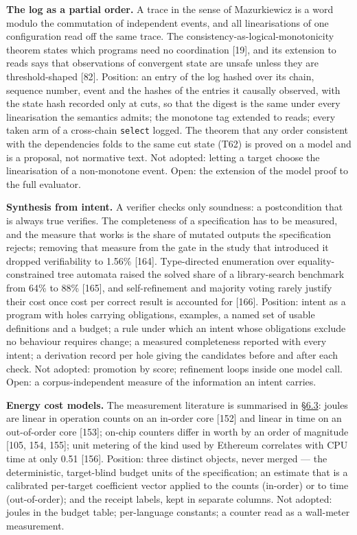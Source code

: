 \documentclass[10pt,letterpaper]{article}
\begin{document}
\textbf{The log as a partial order.} A trace in the sense of
Mazurkiewicz is a word modulo the commutation of independent events, and
all linearisations of one configuration read off the same trace. The
consistency-as-logical-monotonicity theorem states which programs need
no coordination {[}19{]}, and its extension to reads says that
observations of convergent state are unsafe unless they are
threshold-shaped {[}82{]}. Position: an entry of the log hashed over its
chain, sequence number, event and the hashes of the entries it causally
observed, with the state hash recorded only at cuts, so that the digest
is the same under every linearisation the semantics admits; the monotone
tag extended to reads; every taken arm of a cross-chain \texttt{select}
logged. The theorem that any order consistent with the dependencies
folds to the same cut state (T62) is proved on a model and is a
proposal, not normative text. Not adopted: letting a target choose the
linearisation of a non-monotone event. Open: the extension of the model
proof to the full evaluator.

\textbf{Synthesis from intent.} A verifier checks only soundness: a
postcondition that is always true verifies. The completeness of a
specification has to be measured, and the measure that works is the
share of mutated outputs the specification rejects; removing that
measure from the gate in the study that introduced it dropped
verifiability to 1.56\% {[}164{]}. Type-directed enumeration over
equality-constrained tree automata raised the solved share of a
library-search benchmark from 64\% to 88\% {[}165{]}, and
self-refinement and majority voting rarely justify their cost once cost
per correct result is accounted for {[}166{]}. Position: intent as a
program with holes carrying obligations, examples, a named set of usable
definitions and a budget; a rule under which an intent whose obligations
exclude no behaviour requires change; a measured completeness reported
with every intent; a derivation record per hole giving the candidates
before and after each check. Not adopted: promotion by score; refinement
loops inside one model call. Open: a corpus-independent measure of the
information an intent carries.

\textbf{Energy cost models.} The measurement literature is summarised in
\href{https://research.openie.dev/papers/rce/\#63-energy}{§6.3}: joules
are linear in operation counts on an in-order core {[}152{]} and linear
in time on an out-of-order core {[}153{]}; on-chip counters differ in
worth by an order of magnitude {[}105, 154, 155{]}; unit metering of the
kind used by Ethereum correlates with CPU time at only 0.51 {[}156{]}.
Position: three distinct objects, never merged --- the deterministic,
target-blind budget units of the specification; an estimate that is a
calibrated per-target coefficient vector applied to the counts
(in-order) or to time (out-of-order); and the receipt labels, kept in
separate columns. Not adopted: joules in the budget table; per-language
constants; a counter read as a wall-meter measurement.
\end{document}
